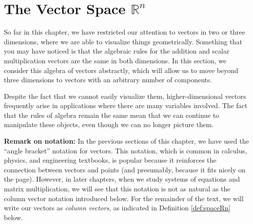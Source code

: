 \section{The Vector Space $\mathbb{R}^n$}\label{sec:Rn}
So far in this chapter, we have restricted our attention to vectors in two or three dimensions, where we are able to visualize things geometrically. Something that you may have noticed is that the algebraic rules for the addition and scalar multiplication vectors are the same in both dimensions.
In this section, we consider this algebra of vectors abstractly, which will allow us to move beyond three dimensions to vectors with an arbitrary number of components. 

Despite the fact that we cannot easily visualize them, higher-dimensional vectors frequently arise in applications where there are many variables involved. The fact that the rules of algebra remain the same mean that we can continue to manipulate these objects, even though we can no longer picture them.


\textbf{Remark on notation:} In the previous sections of this chapter, we have used the ``angle bracket'' notation for vectors. This notation, which is common in calculus, physics, and engineering textbooks, is popular because it reinforces the connection between vectors and points (and presumably, because it fits nicely on the page). However, in later chapters, when we study systems of equations and matrix multiplication, we will see that this notation is not as natural as the column vector notation introduced below. For the remainder of the text, we will write our vectors as \textit{column vectors}, as indicated in Definition \ref{def:spaceRn} below.


